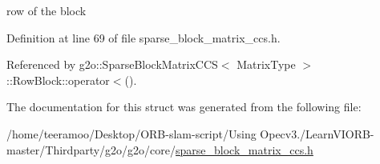 row of the block 



Definition at line 69 of file sparse\+\_\+block\+\_\+matrix\+\_\+ccs.\+h.



Referenced by g2o\+::\+Sparse\+Block\+Matrix\+C\+C\+S$<$ Matrix\+Type $>$\+::\+Row\+Block\+::operator$<$().



The documentation for this struct was generated from the following file\+:\begin{DoxyCompactItemize}
\item 
/home/teeramoo/\+Desktop/\+O\+R\+B-\/slam-\/script/\+Using Opecv3./\+Learn\+V\+I\+O\+R\+B-\/master/\+Thirdparty/g2o/g2o/core/\hyperlink{sparse__block__matrix__ccs_8h}{sparse\+\_\+block\+\_\+matrix\+\_\+ccs.\+h}\end{DoxyCompactItemize}
